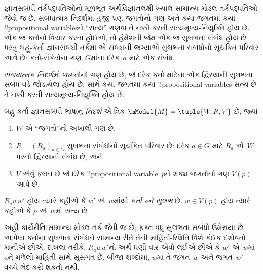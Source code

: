 \documentclass[../../../include/open-logic-section]{subfiles}
\begin{document}


જ્ઞાનસંબંધી તર્કપદ્ધતિઓનો મૂળભૂત અર્થવિજ્ઞાનલક્ષી ખ્યાલ સામાન્ય
મોડલ તર્કપદ્ધતિઓ જેવો જ છે. સંબંધાત્મક નિદર્શમાં હજી પણ જગતોનો
ગણ અને કયા જગતમાં કયાં !!{propositional
variable}sને ``સત્ય'' ગણવા તે નક્કી કરતી સત્યમૂલ્ય-નિયુક્તિ હોય છે. એક જ
કર્તાનો વિચાર કરતા હોઈએ, તો હંમેશની જેમ એક જ સુલભતા સંબંધ
હોય છે. પરંતુ બહુ-કર્તા જ્ઞાનસંબંધી તર્કમાં એ સંબંધની જગ્યાએ
સુલભતા સંબંધોનો સૂચકિત પરિવાર આવે છે: કર્તા-સંકેતોના ગણ~$G$માંના દરેક~$a$
માટે એક સંબંધ.

\emph{સંબંધાત્મક નિદર્શ}માં જગતોનો ગણ હોય છે, જે દરેક કર્તા
માટેના એક દ્વિસ્થાની સુલભતા સંબંધ વડે જોડાયેલા હોય છે; સાથે
કયા જગતમાં કયાં !!{propositional variable}s સત્ય છે તે નક્કી
કરતી સત્યમૂલ્ય-નિયુક્તિ હોય છે.

\begin{defn}
  બહુ-કર્તા જ્ઞાનસંબંધી ભાષાનું \emph{નિદર્શ} એ ત્રિક
  $\mModel{M} = \tuple{W, R, V}$ છે, જ્યાં
  \begin{enumerate}
  \item $W$ એ ``જગતો''નો અખાલી ગણ છે,
  \item $R=(R_a)_{a\in G}$ સુલભતા સંબંધોનો સૂચકિત પરિવાર છે:
  દરેક $a \in G$ માટે ${R}_a$ એ~$W$ પરનો દ્વિસ્થાની સંબંધ છે, અને
  \item $V$ એવું ફલન છે જે દરેક !!{propositional
    variable}~$p$ને શક્ય જગતોનો ગણ $V(p)$ આપે છે.
  \end{enumerate}
  $R_a ww'$ હોય ત્યારે કહીએ કે $w'$ એ~$w$માંથી
  \emph{કર્તા aને સુલભ} છે. $w \in V(p)$ હોય ત્યારે કહીએ કે
  $p$ એ~$w$માં \emph{સત્ય} છે.
\end{defn}


અહીં કાર્યરીતિ સામાન્ય મોડલ તર્ક જેવી જ છે; ફક્ત વધુ સુલભતા
સંબંધો ઉમેરાયા છે. આપેલા કર્તાના સુલભતા સંબંધને સામાન્ય રીતે
તેની માહિતી-સ્થિતિ વિશે કંઈક દર્શાવતો માનીએ છીએ. દાખલા તરીકે,
$R_a ww'$નો અર્થ ઘણી વાર એવો લઈએ છીએ કે $w'$ એ~$w$માં~$a$ને
મળેલી માહિતી સાથે સુસંગત છે. બીજા શબ્દોમાં, $w$માં તે
જગત~$w$ અને જગત~$w'$ વચ્ચે ભેદ કરી શકતો નથી.
\end{document}
